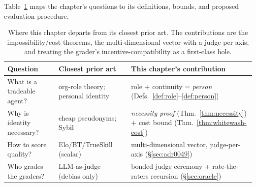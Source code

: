\documentclass[11pt,a4paper]{article}
\theoremstyle{definition}
\begin{document}
Table~\ref{tab:contributions} maps the chapter's questions to its definitions,
bounds, and proposed evaluation procedure.

\begin{table}[H]
\centering\small\renewcommand{\arraystretch}{1.3}
\begin{tabularx}{\textwidth}{@{}>{\raggedright\arraybackslash}X >{\raggedright\arraybackslash}X >{\raggedright\arraybackslash}X@{}}
\toprule
\textbf{Question} & \textbf{Closest prior art} & \textbf{This chapter's contribution} \\
\midrule
What is a tradeable agent? & org-role theory; personal identity & role + continuity = \emph{person} (Defs.~\ref{def:role}--\ref{def:person}) \\
Why is identity necessary? & cheap pseudonyms; Sybil & \emph{necessity proof} (Thm.~\ref{thm:necessity}) + cost bound (Thm.~\ref{thm:whitewash-cost}) \\
How to score quality? & Elo/BT/TrueSkill (scalar) & multi-dimensional vector, judge-per-axis (\S\ref{sec:adr0049}) \\
Who grades the graders? & LLM-as-judge (debias only) & bonded judge ceremony + rate-the-raters recursion (\S\ref{sec:oracle}) \\
\bottomrule
\end{tabularx}
\caption{Where this chapter departs from its closest prior art. The contributions are
the impossibility/cost theorems, the multi-dimensional vector with a judge per
axis, and treating the grader's incentive-compatibility as a first-class hole.}
\label{tab:contributions}
\end{table}
\end{document}
